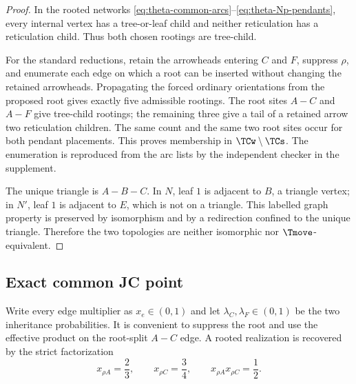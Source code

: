 \begin{proof}
In the rooted networks \eqref{eq:theta-common-arcs}--\eqref{eq:theta-Np-pendants}, every internal vertex has a tree-or-leaf child and neither reticulation has a reticulation child.  Thus both chosen rootings are tree-child.

For the standard reductions, retain the arrowheads entering $C$ and $F$, suppress $\rho$, and enumerate each edge on which a root can be inserted without changing the retained arrowheads.  Propagating the forced ordinary orientations from the proposed root gives exactly five admissible rootings.  The root sites $A-C$ and $A-F$ give tree-child rootings; the remaining three give a tail of a retained arrow two reticulation children.  The same count and the same two root sites occur for both pendant placements.  This proves membership in $\TCw\setminus\TCs$.  The enumeration is reproduced from the arc lists by the independent checker in the supplement.

The unique triangle is $A-B-C$.  In $N$, leaf $1$ is adjacent to $B$, a triangle vertex; in $N'$, leaf $1$ is adjacent to $E$, which is not on a triangle.  This labelled graph property is preserved by isomorphism and by a redirection confined to the unique triangle.  Therefore the two topologies are neither isomorphic nor $\Tmove$-equivalent.
\end{proof}

\subsection{Exact common JC point}

Write every edge multiplier as $x_e\in(0,1)$ and let $\lambda_C,\lambda_F\in(0,1)$ be the two inheritance probabilities.  It is convenient to suppress the root and use the effective product on the root-split $A-C$ edge.  A rooted realization is recovered by the strict factorization
\begin{equation}\label{eq:theta-root-factor}
 x_{\rho A}=\frac23,\qquad x_{\rho C}=\frac34,
 \qquad x_{\rho A}x_{\rho C}=\frac12.
\end{equation}

